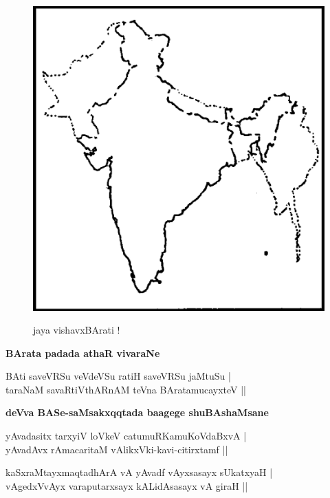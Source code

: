 \begin{figure}[H]
\centering
{\includegraphics[scale=.19]{0019.eps}}
\caption{jaya vishavxBArati !}
\end{figure}

\noindent
{\large\bf BArata padada athaR vivaraNe}\label{20}
\medskip

\begin{shloka}
BAti saveVRSu veVdeVSu ratiH saveVRSu jaMtuSu |\\\label{20a}
taraNaM savaRtiVthARnAM teVna BAratamucayxteV ||
\end{shloka}

\medskip
\noindent
{\large\bf deVva BASe-saMsakxqqtada baagege shuBAshaMsane}\label{20b}
\medskip

\begin{shloka}
yAvadasitx tarxyiV loVkeV catumuRKamuKoVdaBxvA |\\\label{20c}
yAvadAvx rAmacaritaM vAlikxVki-kavi-citirxtamf ||
\end{shloka}

\begin{shloka}
kaSxraMtayxmaqtadhArA vA yAvadf vAyxsasayx sUkatxyaH |\\
vAgedxVvAyx varaputarxsayx kALidAsasayx vA giraH ||
\end{shloka}

